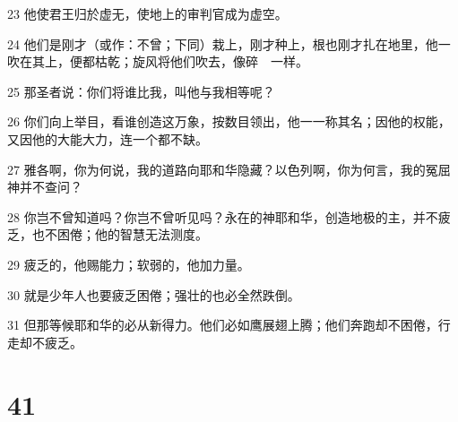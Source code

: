 \par 23 他使君王归於虚无，使地上的审判官成为虚空。
\par 24 他们是刚才（或作：不曾；下同）栽上，刚才种上，根也刚才扎在地里，他一吹在其上，便都枯乾；旋风将他们吹去，像碎　一样。
\par 25 那圣者说：你们将谁比我，叫他与我相等呢？
\par 26 你们向上举目，看谁创造这万象，按数目领出，他一一称其名；因他的权能，又因他的大能大力，连一个都不缺。
\par 27 雅各啊，你为何说，我的道路向耶和华隐藏？以色列啊，你为何言，我的冤屈神并不查问？
\par 28 你岂不曾知道吗？你岂不曾听见吗？永在的神耶和华，创造地极的主，并不疲乏，也不困倦；他的智慧无法测度。
\par 29 疲乏的，他赐能力；软弱的，他加力量。
\par 30 就是少年人也要疲乏困倦；强壮的也必全然跌倒。
\par 31 但那等候耶和华的必从新得力。他们必如鹰展翅上腾；他们奔跑却不困倦，行走却不疲乏。

\chapter{41}


